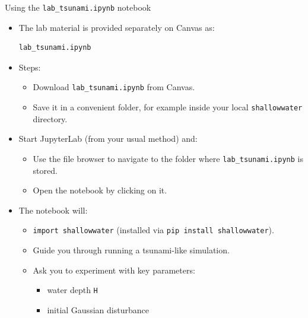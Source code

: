 \documentclass[]{beamer}
\begin{document}
\begin{frame}[fragile,shrink=8]{Using the \texttt{lab\_tsunami.ipynb} notebook}
\begin{itemize}
  \item The lab material is provided separately on Canvas as:
\begin{verbatim}
lab_tsunami.ipynb
\end{verbatim}

  \item Steps:
    \begin{itemize}
      \item Download \texttt{lab\_tsunami.ipynb} from Canvas.
      \item Save it in a convenient folder, for example inside your local
            \texttt{shallowwater} directory.
    \end{itemize}

  \item Start JupyterLab (from your usual method) and:
    \begin{itemize}
      \item Use the file browser to navigate to the folder where
            \texttt{lab\_tsunami.ipynb} is stored.
      \item Open the notebook by clicking on it.
    \end{itemize}

  \item The notebook will:
    \begin{itemize}
      \item \texttt{import shallowwater} (installed via \texttt{pip install shallowwater}).
      \item Guide you through running a tsunami-like simulation.
      \item Ask you to experiment with key parameters:
        \begin{itemize}
          \item water depth \texttt{H}
          \item initial Gaussian disturbance
        \end{itemize}
    \end{itemize}
\end{itemize}
\end{frame}
\end{document}
